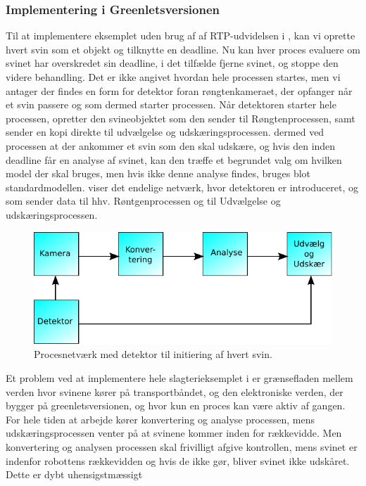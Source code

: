 \subsubsection*{Implementering i Greenletsversionen}
Til at implementere eksemplet uden brug af af RTP-udvidelsen i \pycsp, kan vi oprette hvert svin som et objekt og tilknytte en deadline. Nu kan hver proces evaluere om svinet har overskredet sin deadline, i det tilfælde fjerne svinet, og stoppe den videre behandling. Det er ikke angivet hvordan hele processen startes, men vi antager der findes en form for detektor foran røngtenkameraet, der opfanger når et svin passere og som dermed  starter processen. 
Når detektoren starter hele processen, opretter den svineobjektet som den sender til Røngtenprocessen, samt sender en kopi direkte til udvælgelse og udskæringsprocessen. dermed ved processen at der ankommer et svin som den skal udskære, og hvis den inden deadline får en analyse af svinet, kan den træffe et begrundet valg om hvilken model der skal bruges,  men hvis ikke denne analyse findes, bruges blot standardmodellen.  viser det endelige  netværk, hvor detektoren er introduceret, og som sender data til hhv. Røntgenprocessen og til Udvælgelse og udskæringsprocessen. 

\begin{figure}
 \begin{center}
  \includegraphics[scale=1]{images/pig-network2}
	\caption{Procesnetværk med detektor til initiering af hvert svin.}
	\label{fig:pig-network2}
\end{center}
\end{figure}

Et problem ved at implementere hele slagterieksemplet i \pycsp er  grænsefladen mellem verden hvor svinene kører på transportbåndet, og den elektroniske verden, der bygger på greenletsversionen, og hvor  kun en proces kan være aktiv af gangen. For hele tiden at arbejde kører konvertering og analyse processen, mens  udskæringsprocessen venter på at svinene kommer inden for rækkevidde. Men konvertering og analysen processen  skal frivilligt afgive kontrollen, mens svinet er indenfor robottens rækkevidden og hvis de ikke gør, bliver svinet ikke udskåret. Dette er dybt uhensigstmæssigt 



